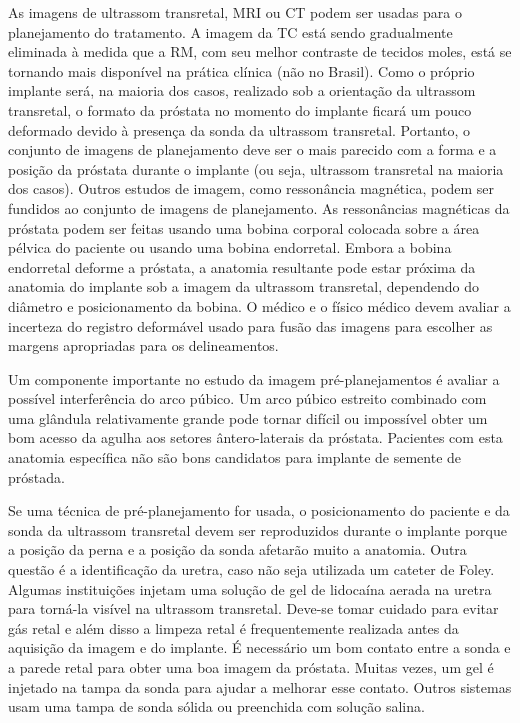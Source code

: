 \documentclass[11pt,a4paper]{article}
\begin{document}
	As imagens de ultrassom transretal, MRI ou CT podem ser usadas para o planejamento do tratamento. A imagem da TC está sendo gradualmente eliminada à medida que a RM, com seu melhor contraste de tecidos moles, está se tornando mais disponível na prática clínica (não no Brasil). Como o próprio implante será, na maioria dos casos, realizado sob a orientação da ultrassom transretal, o formato da próstata no momento do implante ficará um pouco deformado devido à presença da sonda da ultrassom transretal. Portanto, o conjunto de imagens de planejamento deve ser o mais parecido com a forma e a posição da próstata durante o implante (ou seja, ultrassom transretal na maioria dos casos). Outros estudos de imagem, como ressonância magnética, podem ser fundidos ao conjunto de imagens de planejamento. As ressonâncias magnéticas da próstata podem ser feitas usando uma bobina corporal colocada sobre a área pélvica do paciente ou usando uma bobina endorretal. Embora a bobina endorretal deforme a próstata, a anatomia resultante pode estar próxima da anatomia do implante sob a imagem da ultrassom transretal, dependendo do diâmetro e posicionamento da bobina. O médico e o físico médico devem avaliar a incerteza do registro deformável usado para fusão das imagens para escolher as margens apropriadas para os delineamentos.

	Um componente importante no estudo da imagem pré-planejamentos é avaliar a possível interferência do arco púbico. Um arco púbico estreito combinado com uma glândula relativamente grande pode tornar difícil ou impossível obter um bom acesso da agulha aos setores ântero-laterais da próstata. Pacientes com esta anatomia específica não são bons candidatos para implante de semente de próstada.

	Se uma técnica de pré-planejamento for usada, o posicionamento do paciente e da sonda da ultrassom transretal devem ser reproduzidos durante o implante porque a posição da perna e a posição da sonda afetarão muito a anatomia. Outra questão é a identificação da uretra, caso não seja utilizada um cateter de Foley. Algumas instituições injetam uma solução de gel de lidocaína aerada na uretra para torná-la visível na ultrassom transretal. Deve-se tomar cuidado para evitar gás retal e além disso a limpeza retal é frequentemente realizada antes da aquisição da imagem e do implante. É necessário um bom contato entre a sonda e a parede retal para obter uma boa imagem da próstata. Muitas vezes, um gel é injetado na tampa da sonda para ajudar a melhorar esse contato. Outros sistemas usam uma tampa de sonda sólida ou preenchida com solução salina.
	
\end{document}
